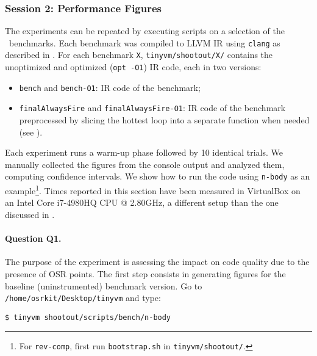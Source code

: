 
\subsubsection{Session 2: Performance Figures}

The experiments can be repeated by executing scripts on a selection of the \shootout\ benchmarks. Each benchmark was compiled to LLVM IR using {\tt clang} as described in . For each benchmark {\tt X}, {\small\tt tinyvm/shootout/X/} contains the unoptimized and optimized ({\tt opt -O1}) IR code, each in two versions:

\begin{itemize}[parsep=0pt]
\item {\tt bench} and {\tt bench-O1}: IR code of the benchmark;
\item {\tt finalAlwaysFire} and {\tt finalAlwaysFire-O1}: IR code of the benchmark preprocessed by slicing the hottest loop into a separate function when needed (see ).
\end{itemize}

\noindent Each experiment runs a warm-up phase followed by 10 identical trials. We manually collected the figures from the console output and analyzed them, computing confidence intervals. We show how to run the code using {\tt n-body} as an example\footnote{For {\tt rev-comp}, first run {\tt bootstrap.sh} in {\tt tinyvm/shootout/}. }. Times reported in this section have been measured in VirtualBox on an Intel Core i7-4980HQ CPU @ 2.80GHz, a different setup than the one discussed in .

\paragraph{Question Q1.} The purpose of the experiment is assessing the impact on code quality due to the presence of OSR points.
The first step consists in generating figures for the baseline (uninstrumented) benchmark version. Go to {\small\tt /home/osrkit/Desktop/tinyvm} and type:
\begin{small}
\begin{verbatim}
$ tinyvm shootout/scripts/bench/n-body
\end{verbatim}
\end{small}

